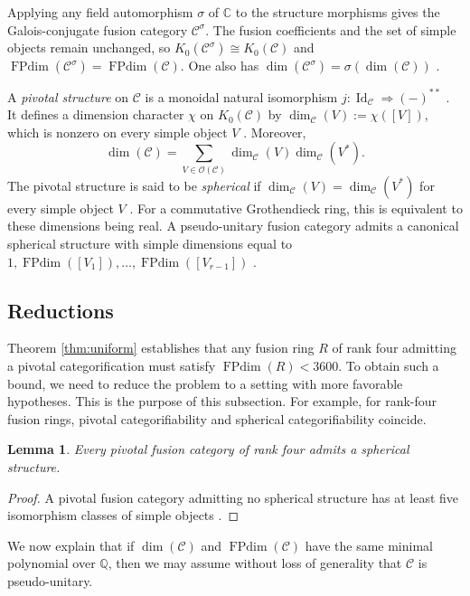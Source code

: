 \documentclass[11pt]{amsart}
\newtheorem{lemma}[theorem]{Lemma}
\theoremstyle{definition}
\DeclareMathOperator{\FPdim}{FPdim}
\newcommand{\C}{\mathbb C}
\newcommand{\Q}{\mathbb Q}
\numberwithin{equation}{section}
\begin{document}
Applying any field automorphism $\sigma$ of $\C$ to the
structure morphisms gives the Galois-conjugate fusion category
$\mathcal C^\sigma$. The fusion coefficients and the set of simple objects remain
unchanged, so $K_0(\mathcal C^\sigma)\cong K_0(\mathcal C)$ and
$\FPdim(\mathcal C^\sigma)=\FPdim(\mathcal C)$.
One also has $\dim(\mathcal C^\sigma)=\sigma(\dim(\mathcal C))$
\cite[\S2.1]{OstrikGlobal}.

A \textit{pivotal structure} on $\mathcal C$ is a monoidal natural isomorphism
$j:\operatorname{Id}_{\mathcal C}\Rightarrow(-)^{**}$
\cite[Definition~4.7.7]{EGNO}. It defines a dimension character $\chi$ on $K_0(\mathcal{C})$ by $\dim_{\mathcal C}(V):=\chi([V])$, which is nonzero on every simple object $V$ \cite[Propositions~4.7.12 and~4.8.4]{EGNO}. 
Moreover, \[
 \dim(\mathcal C)=
 \sum_{V\in\mathcal O(\mathcal C)}
 \dim_{\mathcal C}(V)\dim_{\mathcal C}(V^*).
\]
The pivotal structure is said to be \textit{spherical} if $\dim_{\mathcal C}(V)=\dim_{\mathcal C}(V^*)$ for every simple object $V$
\cite[Definition~4.7.14]{EGNO}. 
For a commutative Grothendieck ring, this
is equivalent to these dimensions being real. 
A pseudo-unitary fusion category admits a canonical spherical structure
with simple dimensions equal to $1,\FPdim([V_1]), \dots, \FPdim([V_{r-1}])$ \cite[Proposition~9.5.1]{EGNO}.

\subsection{Reductions} 
Theorem \ref{thm:uniform} establishes that any fusion ring $R$ of rank four admitting a pivotal categorification must satisfy $\FPdim(R) < 3600$.
To obtain such a bound, we need to reduce the problem to a setting with more favorable hypotheses. 
This is the purpose of this subsection. 
For example, for rank-four fusion rings, pivotal categorifiability and spherical categorifiability coincide.

\begin{lemma}\label{lem:spherical}
Every pivotal fusion category of rank four admits a spherical structure.
\end{lemma}
\begin{proof}
A pivotal fusion category admitting no spherical structure has at
least five isomorphism classes of simple objects \cite[\S7, Lemma~4]{HaggeHong}.
\end{proof}

We now explain that if $\dim(\mathcal{C})$ and $\FPdim(\mathcal{C})$ have the same minimal polynomial over $\Q$, then we may assume without loss of generality that $\mathcal{C}$ is pseudo-unitary. 
\end{document}
